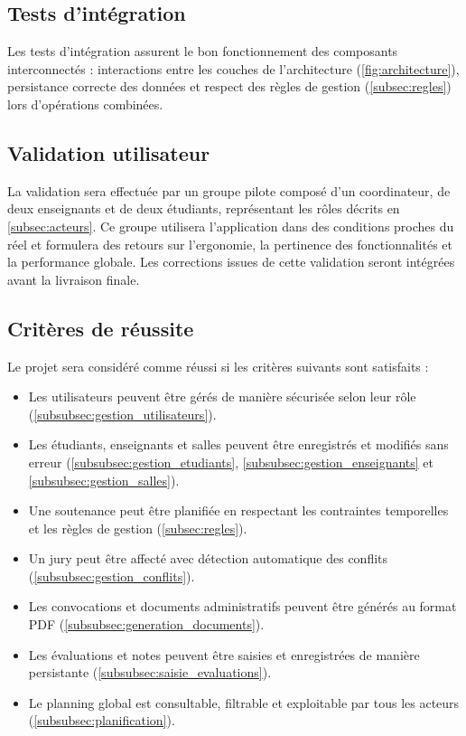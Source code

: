 \documentclass[12pt,a4paper]{article}
\begin{document}
\subsection{Tests d'intégration}
\label{subsec:tests_integration}
Les tests d'intégration assurent le bon fonctionnement
des composants interconnectés : interactions entre les couches de l'architecture
(\ref{fig:architecture}), persistance correcte des données et respect des règles de gestion
(\ref{subsec:regles}) lors d'opérations combinées.

\subsection{Validation utilisateur}
\label{subsec:validation_utilisateur}

La validation sera effectuée par un groupe pilote composé d'un coordinateur, de
deux enseignants et de deux étudiants, représentant les rôles décrits en
\ref{subsec:acteurs}. Ce groupe utilisera l'application dans des conditions
proches du réel et formulera des retours sur l'ergonomie, la pertinence des
fonctionnalités et la performance globale. Les corrections issues de cette
validation seront intégrées avant la livraison finale.

\subsection{Critères de réussite}
\label{subsec:criteres_reussite}

Le projet sera considéré comme réussi si les critères suivants sont satisfaits :

\begin{itemize}[label=\textcolor{primary}{\textbullet}, leftmargin=1.5cm]
    \item Les utilisateurs peuvent être gérés de manière sécurisée selon leur
          rôle (\ref{subsubsec:gestion_utilisateurs}).
    \item Les étudiants, enseignants et salles peuvent être enregistrés et
          modifiés sans erreur (\ref{subsubsec:gestion_etudiants}, \ref{subsubsec:gestion_enseignants} et \ref{subsubsec:gestion_salles}).
    \item Une soutenance peut être planifiée en respectant les contraintes
          temporelles et les règles de gestion (\ref{subsec:regles}).
    \item Un jury peut être affecté avec détection automatique des conflits
          (\ref{subsubsec:gestion_conflits}).
    \item Les convocations et documents administratifs peuvent être générés au
          format PDF (\ref{subsubsec:generation_documents}).
    \item Les évaluations et notes peuvent être saisies et enregistrées de
          manière persistante (\ref{subsubsec:saisie_evaluations}).
    \item Le planning global est consultable, filtrable et exploitable par tous
          les acteurs (\ref{subsubsec:planification}).
\end{itemize}
\end{document}
